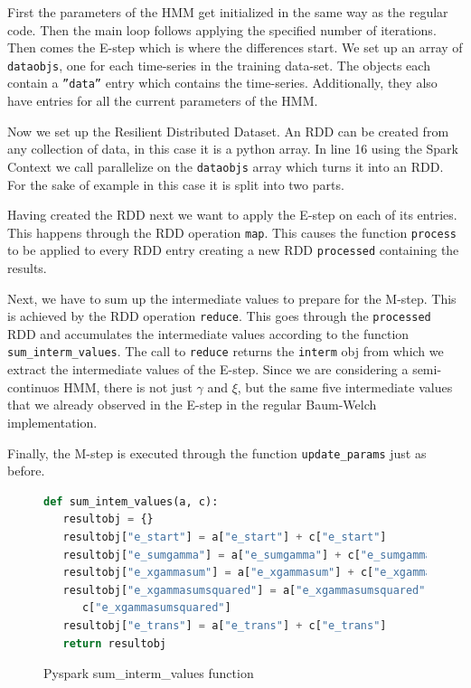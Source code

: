 First the parameters of the HMM get initialized in the same way as the regular code. Then the main loop follows applying the specified number of iterations. Then comes the E-step which is where the differences start. We set up an array of \texttt{dataobjs}, one for each time-series in the training data-set. The objects each contain a \texttt{''data''} entry which contains the time-series. Additionally, they also have entries for all the current parameters of the HMM. 

Now we set up the Resilient Distributed Dataset. An RDD can be created from any collection of data, in this case it is a python array. In line 16 using the Spark Context we call parallelize on the \texttt{dataobjs} array which turns it into an RDD. For the sake of example in this case it is split into two parts. 

Having created the RDD next we want to apply the E-step on each of its entries. This happens through the RDD operation \texttt{map}. This causes the function \texttt{process} to be applied to every RDD entry creating a new RDD \texttt{processed} containing the results. 

Next, we have to sum up the intermediate values to prepare for the M-step. This is achieved by the RDD operation \texttt{reduce}. This goes through the \texttt{processed} RDD and accumulates the intermediate values according to the function \texttt{sum\_interm\_values}. The call to \texttt{reduce} returns the \texttt{interm} obj from which we extract the intermediate values of the E-step. Since we are considering a semi-continuos HMM, there is not just $\gamma$ and $\xi$, but the same five intermediate values that we already observed in the E-step in the regular Baum-Welch implementation. 

Finally, the M-step is executed through the function \texttt{update\_params} just as before. 

\newpage

\begin{figure}
\begin{singlespace}
\begin{lstlisting}[language=Python]
def sum_intem_values(a, c):
   resultobj = {}
   resultobj["e_start"] = a["e_start"] + c["e_start"]
   resultobj["e_sumgamma"] = a["e_sumgamma"] + c["e_sumgamma"]
   resultobj["e_xgammasum"] = a["e_xgammasum"] + c["e_xgammasum"]
   resultobj["e_xgammasumsquared"] = a["e_xgammasumsquared"] + \
      c["e_xgammasumsquared"]
   resultobj["e_trans"] = a["e_trans"] + c["e_trans"]
   return resultobj
\end{lstlisting}
\end{singlespace}
\caption{Pyspark sum\_interm\_values function}    
\label{fig:pyspark-sum-listing}
\end{figure}

